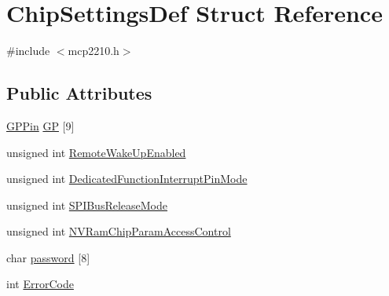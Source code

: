 \hypertarget{struct_chip_settings_def}{\section{\-Chip\-Settings\-Def \-Struct \-Reference}
\label{struct_chip_settings_def}
}


{\ttfamily \#include $<$mcp2210.\-h$>$}

\subsection*{\-Public \-Attributes}
\begin{DoxyCompactItemize}
\item 
\hyperlink{struct_g_p_pin}{\-G\-P\-Pin} \hyperlink{struct_chip_settings_def_aea8065ee4c940dcbde93dd1633c63f38}{\-G\-P} \mbox{[}9\mbox{]}
\item 
unsigned int \hyperlink{struct_chip_settings_def_a5a29397e3fd6793de5d8d348b3b11d22}{\-Remote\-Wake\-Up\-Enabled}
\item 
unsigned int \hyperlink{struct_chip_settings_def_af61e2aaa5bcf3284abd4554d2be88002}{\-Dedicated\-Function\-Interrupt\-Pin\-Mode}
\item 
unsigned int \hyperlink{struct_chip_settings_def_abeaf6785170c987a19025a506cf14a8d}{\-S\-P\-I\-Bus\-Release\-Mode}
\item 
unsigned int \hyperlink{struct_chip_settings_def_a56bcb330a04c9b6b108ee63ce635c92d}{\-N\-V\-Ram\-Chip\-Param\-Access\-Control}
\item 
char \hyperlink{struct_chip_settings_def_a0e9e9123c42b18bdd6294d0ae7935582}{password} \mbox{[}8\mbox{]}
\item 
int \hyperlink{struct_chip_settings_def_a711cd7ddde92dcfefaba6863b303ab3d}{\-Error\-Code}
\end{DoxyCompactItemize}


